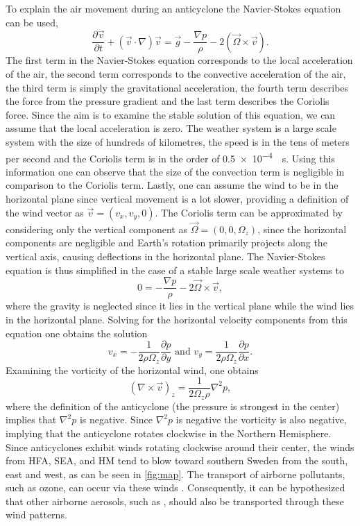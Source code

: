 To explain the air movement during an anticyclone the Navier-Stokes equation can be used,
\begin{equation} 
    \frac{\partial \vec{v}}{\partial t} + (\vec{v} \cdot \nabla)\vec{v} = \vec{g} - \frac{\nabla p}{\rho} - 2\left(\vec{\Omega} \times \vec{v}\right). \label{eq:NavierStokes} 
\end{equation}
The first term in the Navier-Stokes equation corresponds to the local acceleration of the air, the second term corresponds to the convective acceleration of the air, the third term is simply the gravitational acceleration, the fourth term describes the force from the pressure gradient and the last term describes the Coriolis force. Since the aim is to examine the stable solution of this equation, we can assume that the local acceleration is zero. The weather system is a large scale system with the size of hundreds of kilometres, the speed is in the tens of meters per second and the Coriolis term is in the order of \SI{0.5e-4}{\per\s}. Using this information one can observe that the size of the convection term is negligible in comparison to the Coriolis term. Lastly, one can assume the wind to be in the horizontal plane since vertical movement is a lot slower, providing a definition of the wind vector as $\vec{v}=(v_x,v_y,0)$. The Coriolis term can be approximated by considering only the vertical component as $\vec{\Omega}=(0,0,\Omega_z)$, since the horizontal components are negligible and Earth's rotation primarily projects along the vertical axis, causing deflections in the horizontal plane. The Navier-Stokes equation is thus simplified in the case of a stable large scale weather systems to
\begin{equation} 
    0 = - \frac{\nabla p}{\rho} - 2{\vec{\Omega}} \times \vec{v}, \label{eq:NavierStokes2} 
\end{equation}
where the gravity is neglected since it lies in the vertical plane while the wind lies in the horizontal plane. Solving for the horizontal velocity components from this equation one obtains the solution
\begin{equation} v_x=-\frac{1}{2\rho\Omega_z}\frac{\partial p}{\partial y}\text{ and }v_y=\frac{1}{2\rho\Omega_z}\frac{\partial p}{\partial x}. 
\end{equation}
Examining the vorticity of the horizontal wind, one obtains  
\begin{equation}
    (\nabla \times \vec{v})_z  = \frac{1}{2\Omega_z\rho}\nabla^2p,
\end{equation} 
where the definition of the anticyclone (the pressure is strongest in the center) implies that $\nabla^2p$ is negative. Since $\nabla^2p$ is negative the vorticity is also negative, implying that the anticyclone rotates clockwise in the Northern Hemisphere. Since anticyclones exhibit winds rotating clockwise around their center, the winds from HFA, SEA, and HM tend to blow toward southern Sweden from the south, east and west, as can be seen in \autoref{fig:map}. The transport of airborne pollutants, such as ozone, can occur via these winds \cite{oteroImpactAtmosphericBlocking2022}. Consequently, it can be hypothesized that other airborne aerosols, such as \PM, should also be transported through these wind patterns.

